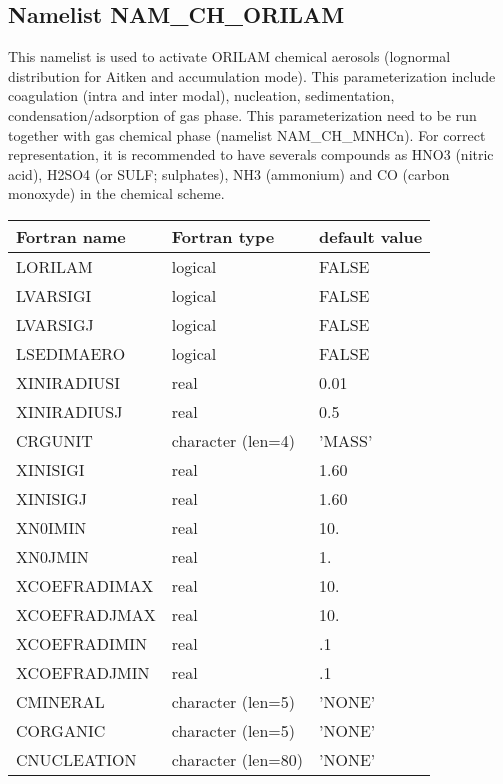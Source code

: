 
\subsection{Namelist NAM\_CH\_ORILAM }
 
This namelist is used to activate ORILAM chemical aerosols (lognormal distribution for Aitken and accumulation mode).
This parameterization include coagulation (intra and inter modal), nucleation,  sedimentation, condensation/adsorption of gas phase.
 This parameterization need to be run together with gas chemical phase (namelist NAM\_CH\_MNHCn). 
For correct representation, it is recommended to have severals compounds as HNO3 (nitric acid), H2SO4 (or SULF; sulphates), NH3 (ammonium) and CO (carbon monoxyde) in the chemical scheme. 

\begin{center}
\begin{tabular} {|l|l|l|}
\hline
Fortran name & Fortran type & default value \\
\hline
LORILAM     & logical  & FALSE  \\
LVARSIGI    & logical  & FALSE  \\
LVARSIGJ    & logical  & FALSE  \\
LSEDIMAERO  & logical  & FALSE  \\
XINIRADIUSI & real     & 0.01  \\
XINIRADIUSJ & real     & 0.5  \\
CRGUNIT     & character (len=4)  & 'MASS'   \\
XINISIGI    & real     & 1.60  \\
XINISIGJ    & real     & 1.60  \\
XN0IMIN     & real     &  10.  \\
XN0JMIN     & real     &  1.   \\
XCOEFRADIMAX& real     &  10.  \\
XCOEFRADJMAX& real     &  10.  \\
XCOEFRADIMIN& real     &  .1  \\
XCOEFRADJMIN& real     &  .1  \\
CMINERAL    & character (len=5)  & 'NONE'   \\
CORGANIC    & character (len=5)  & 'NONE'   \\
CNUCLEATION & character (len=80) & 'NONE'   \\
\hline
\end{tabular}
\end{center}

